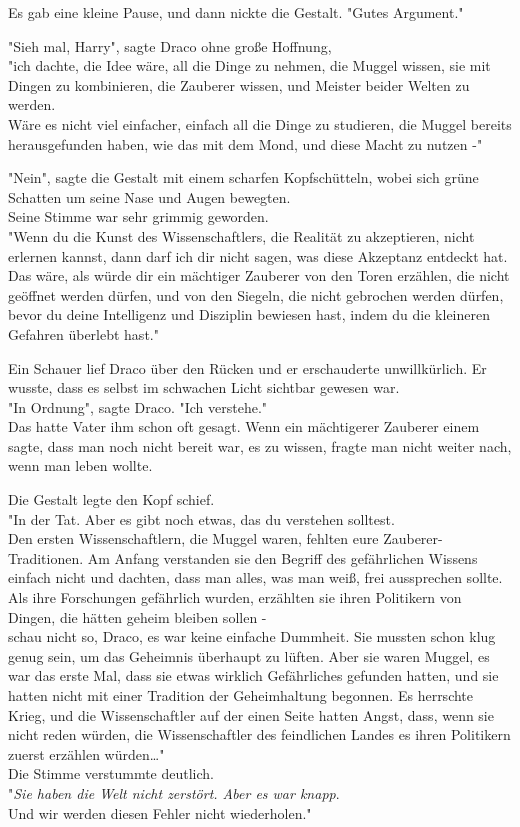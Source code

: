 {Es gab eine kleine Pause, und dann nickte die Gestalt. "Gutes Argument."

"Sieh mal, Harry", sagte Draco ohne große Hoffnung,\\ "ich dachte, die Idee wäre, all die Dinge zu nehmen, die Muggel wissen, sie mit Dingen zu kombinieren, die Zauberer wissen, und Meister beider Welten zu werden.\\ Wäre es nicht viel einfacher, einfach all die Dinge zu studieren, die Muggel bereits herausgefunden haben, wie das mit dem Mond, und diese Macht zu nutzen -"

"Nein", sagte die Gestalt mit einem scharfen Kopfschütteln, wobei sich grüne Schatten um seine Nase und Augen bewegten.\\ Seine Stimme war sehr grimmig geworden.\\ "Wenn du die Kunst des Wissenschaftlers, die Realität zu akzeptieren, nicht erlernen kannst, dann darf ich dir nicht sagen, was diese Akzeptanz entdeckt hat.\\ Das wäre, als würde dir ein mächtiger Zauberer von den Toren erzählen, die nicht geöffnet werden dürfen, und von den Siegeln, die nicht gebrochen werden dürfen, bevor du deine Intelligenz und Disziplin bewiesen hast, indem du die kleineren Gefahren überlebt hast."

Ein Schauer lief Draco über den Rücken und er erschauderte unwillkürlich. Er wusste, dass es selbst im schwachen Licht sichtbar gewesen war.\\ "In Ordnung", sagte Draco. "Ich verstehe."\\ Das hatte Vater ihm schon oft gesagt. Wenn ein mächtigerer Zauberer einem sagte, dass man noch nicht bereit war, es zu wissen, fragte man nicht weiter nach, wenn man leben wollte.

Die Gestalt legte den Kopf schief.\\ "In der Tat. Aber es gibt noch etwas, das du verstehen solltest.\\ Den ersten Wissenschaftlern, die Muggel waren, fehlten eure Zauberer-Traditionen. Am Anfang verstanden sie den Begriff des gefährlichen Wissens einfach nicht und dachten, dass man alles, was man weiß, frei aussprechen sollte.\\ Als ihre Forschungen gefährlich wurden, erzählten sie ihren Politikern von Dingen, die hätten geheim bleiben sollen -\\ schau nicht so, Draco, es war keine einfache Dummheit. Sie mussten schon klug genug sein, um das Geheimnis überhaupt zu lüften. Aber sie waren Muggel, es war das erste Mal, dass sie etwas wirklich Gefährliches gefunden hatten, und sie hatten nicht mit einer Tradition der Geheimhaltung begonnen. Es herrschte Krieg, und die Wissenschaftler auf der einen Seite hatten Angst, dass, wenn sie nicht reden würden, die Wissenschaftler des feindlichen Landes es ihren Politikern zuerst erzählen würden…"\\ Die Stimme verstummte deutlich.\\ "\emph{Sie haben die Welt nicht zerstört. Aber es war knapp}.\\ Und wir werden diesen Fehler nicht wiederholen."

}
